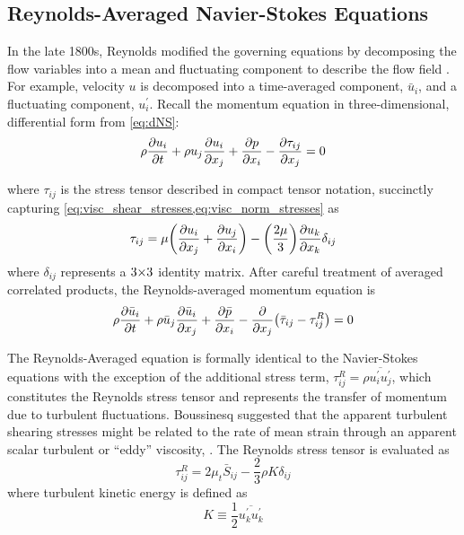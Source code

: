 \subsection{Reynolds-Averaged Navier-Stokes Equations}

In the late 1800s, Reynolds modified the governing equations by decomposing the flow variables into a mean and fluctuating component to describe the flow field \cite{Reynolds1903}. For example, velocity $u$ is decomposed into a time-averaged component, $\bar{u}_i$, and a fluctuating component, $u_i^\prime$. Recall the momentum equation in three-dimensional, differential form from \cref{eq:dNS}:
%
$$ \rho \pdv{u_i}{t} + \rho u_j \pdv{u_i}{x_j} + \pdv{p}{x_i} - \pdv{\tau_{ij}}{x_j} = 0 $$

where $\tau_{ij}$ is the stress tensor described in compact tensor notation, succinctly capturing \cref{eq:visc_shear_stresses,eq:visc_norm_stresses} as
%
$$ \tau_{ij} = \mu \qty(\pdv{u_i}{x_j} + \pdv{u_j}{x_i}) - \qty(\frac{2\mu}{3})\pdv{u_k}{x_k}\delta_{ij} $$
%
where $\delta_{ij}$ represents a $\medmuskip=0mu 3\times3$ identity matrix. After careful treatment of averaged correlated products, the Reynolds-averaged momentum equation is
%
%
\begin{equation} \rho \pdv{\bar{u}_i}{t} + \rho \bar{u}_j \pdv{\bar{u}_i}{x_j} + \pdv{\bar{p}}{x_i} - \pdv{}{x_j}\qty(\bar{\tau}_{ij} - \tau_{ij}^R) = 0 \label{eq:RANS} \end{equation}

%
The Reynolds-Averaged equation is formally identical to the Navier-Stokes equations with the exception of the additional stress term, $\tau_{ij}^R = \rho\overline{u_i^\prime u_j^\prime}$, which constitutes the Reynolds stress tensor and represents the transfer of momentum due to turbulent fluctuations. 
Boussinesq suggested that the apparent turbulent shearing stresses might be related to the rate of mean strain through an apparent scalar turbulent or \enquote{eddy} viscosity, . The Reynolds stress tensor is evaluated as
%
\begin{equation}\label{Boussinesq}
    \tau^R_{ij} = 2\mu_t\bar{S}_{ij} - \frac{2}{3}\rho K\delta_{ij}
\end{equation}
%
where turbulent kinetic energy is defined as
%
\begin{equation}\label{TKE}
    K \equiv \frac{1}{2}\overline{u^\prime_k u^\prime_k}
\end{equation}

